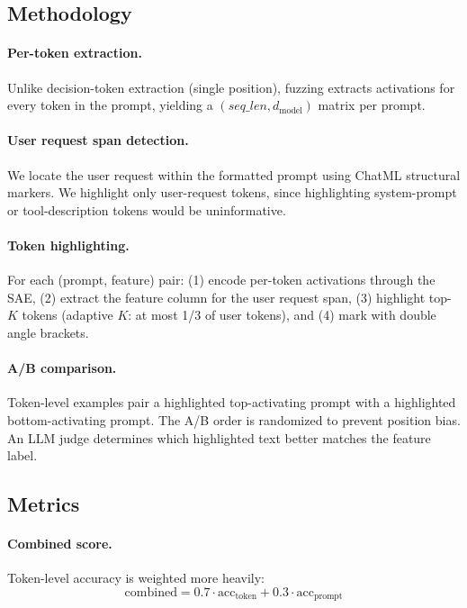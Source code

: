 \documentclass[runningheads]{llncs}
\begin{document}
\subsection{Methodology}

\paragraph{Per-token extraction.} Unlike decision-token extraction (single position), fuzzing extracts activations for every token in the prompt, yielding a $(seq\_len, d_\text{model})$ matrix per prompt.

\paragraph{User request span detection.} We locate the user request within the formatted prompt using ChatML structural markers. We highlight only user-request tokens, since highlighting system-prompt or tool-description tokens would be uninformative.

\paragraph{Token highlighting.} For each (prompt, feature) pair: (1) encode per-token activations through the SAE, (2) extract the feature column for the user request span, (3) highlight top-$K$ tokens (adaptive $K$: at most 1/3 of user tokens), and (4) mark with double angle brackets.

\paragraph{A/B comparison.} Token-level examples pair a highlighted top-activating prompt with a highlighted bottom-activating prompt. The A/B order is randomized to prevent position bias. An LLM judge determines which highlighted text better matches the feature label.

\subsection{Metrics}

\paragraph{Combined score.} Token-level accuracy is weighted more heavily:
\begin{equation}
\text{combined} = 0.7 \cdot \text{acc}_\text{token} + 0.3 \cdot \text{acc}_\text{prompt}
\end{equation}
\end{document}
